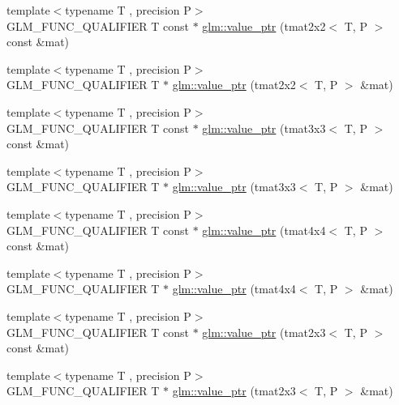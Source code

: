 \begin{DoxyCompactItemize}
\item 
{\footnotesize template$<$typename T , precision P$>$ }\\G\-L\-M\-\_\-\-F\-U\-N\-C\-\_\-\-Q\-U\-A\-L\-I\-F\-I\-E\-R T const $\ast$ \hyperlink{group__gtc__type__ptr_ga2d709523aa0beb0a42433f80c9d07718}{glm\-::value\-\_\-ptr} (tmat2x2$<$ T, P $>$ const \&mat)
\item 
{\footnotesize template$<$typename T , precision P$>$ }\\G\-L\-M\-\_\-\-F\-U\-N\-C\-\_\-\-Q\-U\-A\-L\-I\-F\-I\-E\-R T $\ast$ \hyperlink{group__gtc__type__ptr_gac7256e14328e818e61276fa5e6176b9d}{glm\-::value\-\_\-ptr} (tmat2x2$<$ T, P $>$ \&mat)
\item 
{\footnotesize template$<$typename T , precision P$>$ }\\G\-L\-M\-\_\-\-F\-U\-N\-C\-\_\-\-Q\-U\-A\-L\-I\-F\-I\-E\-R T const $\ast$ \hyperlink{group__gtc__type__ptr_ga0fd20ac385befba86cf2bbf836728bc2}{glm\-::value\-\_\-ptr} (tmat3x3$<$ T, P $>$ const \&mat)
\item 
{\footnotesize template$<$typename T , precision P$>$ }\\G\-L\-M\-\_\-\-F\-U\-N\-C\-\_\-\-Q\-U\-A\-L\-I\-F\-I\-E\-R T $\ast$ \hyperlink{group__gtc__type__ptr_ga4470e16d0e844cb2c4f7b2e731824f87}{glm\-::value\-\_\-ptr} (tmat3x3$<$ T, P $>$ \&mat)
\item 
{\footnotesize template$<$typename T , precision P$>$ }\\G\-L\-M\-\_\-\-F\-U\-N\-C\-\_\-\-Q\-U\-A\-L\-I\-F\-I\-E\-R T const $\ast$ \hyperlink{group__gtc__type__ptr_ga2edadf5433694bf018d62db962b61321}{glm\-::value\-\_\-ptr} (tmat4x4$<$ T, P $>$ const \&mat)
\item 
{\footnotesize template$<$typename T , precision P$>$ }\\G\-L\-M\-\_\-\-F\-U\-N\-C\-\_\-\-Q\-U\-A\-L\-I\-F\-I\-E\-R T $\ast$ \hyperlink{group__gtc__type__ptr_ga1fc49ab60e5afdd4821a6903e92244a4}{glm\-::value\-\_\-ptr} (tmat4x4$<$ T, P $>$ \&mat)
\item 
{\footnotesize template$<$typename T , precision P$>$ }\\G\-L\-M\-\_\-\-F\-U\-N\-C\-\_\-\-Q\-U\-A\-L\-I\-F\-I\-E\-R T const $\ast$ \hyperlink{group__gtc__type__ptr_ga968f2c8899914ea1c1daaaded8daa6b5}{glm\-::value\-\_\-ptr} (tmat2x3$<$ T, P $>$ const \&mat)
\item 
{\footnotesize template$<$typename T , precision P$>$ }\\G\-L\-M\-\_\-\-F\-U\-N\-C\-\_\-\-Q\-U\-A\-L\-I\-F\-I\-E\-R T $\ast$ \hyperlink{group__gtc__type__ptr_ga36fb9a17664c8b6848a5d005e4068a2f}{glm\-::value\-\_\-ptr} (tmat2x3$<$ T, P $>$ \&mat)

\end{DoxyCompactItemize}
